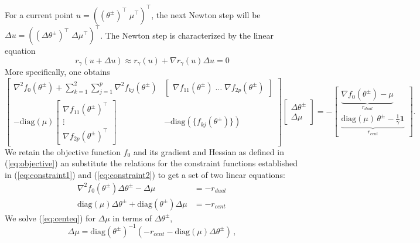 \documentclass[11pt]{report}
\begin{document}
For a current point $u = \left((\theta^{\pm})^{\top} \; \mu^{\top} \right)^{\top}$, the next Newton step will be $\Delta u = \left((\Delta\theta^{\pm})^{\top} \; \Delta\mu^{\top} \right)^{\top}$. The Newton step is characterized by the linear equation
\[r_\gamma(u + \Delta u) \approx r_{\gamma}(u) + \nabla r_{\gamma}(u)\Delta u = 0\] More specifically, one obtains 
\[\begin{bmatrix}
    \nabla^2f_0(\theta^{\pm}) + \sum_{k=1}^2 \sum_{j = 1}^p \nabla^2 f_{kj}(\theta^{\pm}) & \begin{bmatrix} \nabla f_{11}(\theta^{\pm}) \; \ldots \; \nabla f_{2p}(\theta^{\pm})
    \end{bmatrix} \\
    -\text{diag}(\mu) \begin{bmatrix}
      \nabla f_{11}(\theta^{\pm})^{\top} \\
      \vdots \\
      \nabla f_{2p}(\theta^{\pm})^{\top}
    \end{bmatrix}
    &-\text{diag}\left( \{ f_{kj}(\theta^{\pm}) \} \right)
\end{bmatrix}\begin{bmatrix}
\Delta\theta^{\pm} \\[1ex] \Delta\mu
\end{bmatrix} = -\begin{bmatrix}
  \underbrace{\nabla f_0(\theta^{\pm}) - \mu}_{r_{dual}} \\[2ex]
  \underbrace{\text{diag}(\mu) \, \theta^{\pm}
- \frac{1}{\gamma}\mathbf{1}}_{r_{cent}}
\end{bmatrix}.\]
We retain the objective function $f_0$ and its gradient and Hessian as defined in (\ref{eq:objective}) an substitute the relations for the constraint functions established in (\ref{eq:constraint1}) and (\ref{eq:constraint2}) to get a set of two linear equations: %
\begin{align}
\nabla^2f_0(\theta^{\pm})\Delta\theta^{\pm} - \Delta\mu &= -r_{dual}\label{eq:dualeq}\\
\text{diag}(\mu)\Delta\theta^{\pm} + \text{diag}(\theta^{\pm})\Delta\mu &= -r_{cent}\,\label{eq:centeq}
\end{align}
We solve (\ref{eq:centeq}) for $\Delta\mu$ in terms of $\Delta\theta^{\pm}$,
\begin{equation}
\Delta\mu = \text{diag}(\theta^{\pm})^{-1} \left( -r_{cent} - \text{diag}(\mu)\Delta\theta^{\pm} \right)\, ,\label{eq:dellam}
\end{equation}
\end{document}
